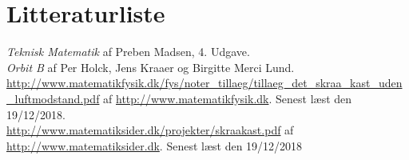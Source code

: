 \section{Litteraturliste}
\emph{Teknisk Matematik} af Preben Madsen, 4. Udgave. \\[0.5cm]
\emph{Orbit B} af Per Holck, Jens Kraaer og Birgitte Merci Lund. \\[0.5cm]
\url{http://www.matematikfysik.dk/fys/noter_tillaeg/tillaeg_det_skraa_kast_uden_luftmodstand.pdf} af \url{http://www.matematikfysik.dk}. Senest læst den 19/12/2018.\\[0.5cm]
\url{http://www.matematiksider.dk/projekter/skraakast.pdf} af \url{http://www.matematiksider.dk}. Senest læst den 19/12/2018






